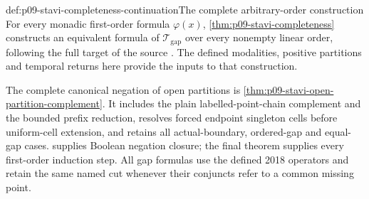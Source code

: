 \begin{proofboundary}{def:p09-stavi-completeness-continuation}{The complete arbitrary-order construction}
For every monadic first-order formula \(\varphi(x)\),
\cref{thm:p09-stavi-completeness} constructs an equivalent formula
of \(\mathcal T_{\mathrm{gap}}\) over every nonempty linear order,
following the full target of the source
\cite[Theorems~2.3 and 4.4]{Rabinovich2018Stavi}.
The defined modalities, positive partitions and temporal returns here
provide the inputs to that construction.

The complete canonical negation of open partitions is
\cref{thm:p09-stavi-open-partition-complement}. It includes the
plain labelled-point-chain complement and the bounded prefix reduction,
resolves forced endpoint singleton cells before uniform-cell extension,
and retains all actual-boundary, ordered-gap and equal-gap cases.
 supplies Boolean negation closure;
the final theorem supplies every first-order induction step.
All gap formulas use the defined 2018 operators and retain the same
named cut whenever their conjuncts refer to a common missing point.
\end{proofboundary}
